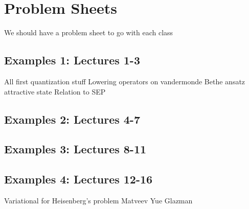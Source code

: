 \section{Problem Sheets}


We should have a problem sheet to go with each class

\subsection{Examples 1: Lectures 1-3}

All first quantization stuff
Lowering operators on vandermonde
Bethe ansatz attractive state
Relation to SEP


\subsection{Examples 2: Lectures 4-7}

\subsection{Examples 3: Lectures 8-11}

\subsection{Examples 4: Lectures 12-16}


Variational for Heisenberg's problem
Matveev Yue Glazman
